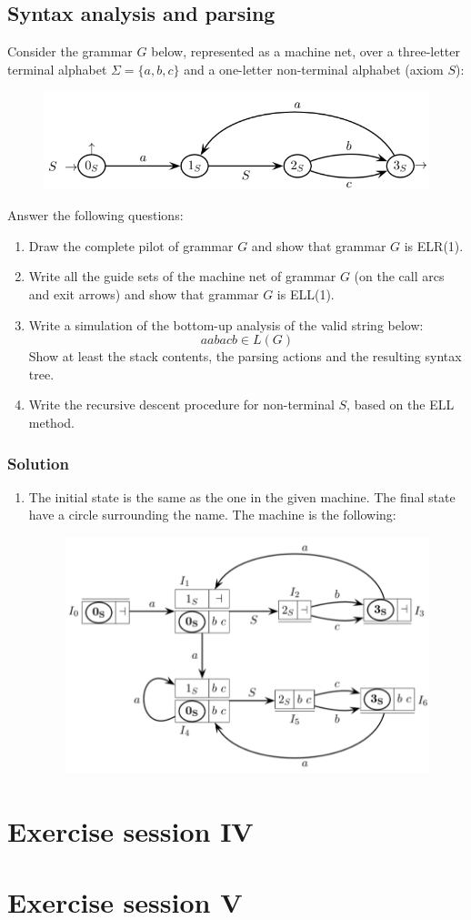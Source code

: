 \documentclass[12pt, a4paper]{report}
\newtheorem[style=M,bodystyle=\normalfont]{theorem}{Theorem}
\newtheorem[style=M,bodystyle=\normalfont]{corollary}{Corollary}
\newtheorem[style=M,bodystyle=\normalfont]{lemma}{Lemma}
\newtheorem[style=M,bodystyle=\normalfont]{definition}{Definition}
\begin{document}
    \section{Syntax analysis and parsing}
    Consider the grammar $G$ below, represented as a machine net, over a three-letter terminal alphabet $\Sigma=\{a,b,c\}$ and a one-letter non-terminal alphabet (axiom $S$):
    \begin{figure}[H]
        \centering
        \includegraphics[width=0.5\linewidth]{images/mnet.png}
    \end{figure}
    Answer the following questions:
    \begin{enumerate}
        \item Draw the complete pilot of grammar $G$ and show that grammar $G$ is ELR(1).
        \item Write all the guide sets of the machine net of grammar $G$ (on the call arcs and exit arrows) and show that grammar $G$ is ELL(1).
        \item Write a simulation of the bottom-up analysis of the valid string below:
            \[a a b a c b \in L(G)\]
            Show at least the stack contents, the parsing actions and the resulting syntax tree.
        \item Write the recursive descent procedure for non-terminal $S$, based on the ELL method.
    \end{enumerate}
    \subsection*{Solution}
    \begin{enumerate}
        \item The initial state is the same as the one in the given machine. The final state have a circle surrounding the name. The machine is the following: 
            \begin{figure}[H]
                \centering
                \includegraphics[width=0.6\linewidth]{images/pilot.png}
            \end{figure} 
    \end{enumerate}




\newpage 

\chapter{Exercise session IV}


\newpage 

\chapter{Exercise session V}
\end{document}
